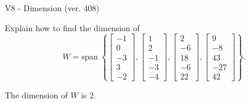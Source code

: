 \begin{exercise}
  \begin{exerciseTitle}V8 - Dimension (ver. 408)\end{exerciseTitle}
  \begin{exerciseStatement}
    Explain how to find the dimension of 
\[W=\mathrm{span}\ \left\{\left[\begin{array}{r}
-1 \\
0 \\
-3 \\
3 \\
-2
\end{array}\right] , \left[\begin{array}{r}
1 \\
2 \\
-1 \\
-3 \\
-4
\end{array}\right] , \left[\begin{array}{r}
2 \\
-6 \\
18 \\
-6 \\
22
\end{array}\right] , \left[\begin{array}{r}
9 \\
-8 \\
43 \\
-27 \\
42
\end{array}\right]\right\}.\]



  \end{exerciseStatement}
  \begin{exerciseAnswer}
   The dimension of \(W\) is  \(2\).
  


  \end{exerciseAnswer}
\end{exercise}